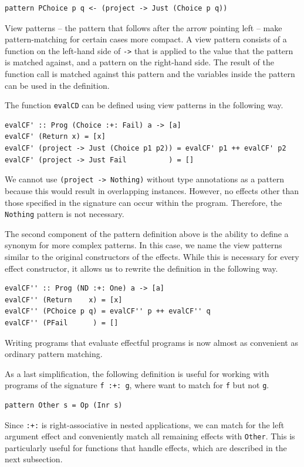 \documentclass[a4paper, 11pt, fleqn, twoside, abstract=on]{scrreprt}
\newcommand{\hinl}[1]{\texttt{#1}}
\begin{document}
\begin{verbatim}
pattern PChoice p q <- (project -> Just (Choice p q))
\end{verbatim}

View patterns -- the pattern that follows after the arrow pointing left -- make pattern-matching for certain cases more compact.
A view pattern consists of a function on the left-hand side of \hinl{->} that is applied to the value that the pattern is matched against, and a pattern on the right-hand side.
The result of the function call is matched against this pattern and the variables inside the pattern can be used in the definition.

The function \hinl{evalCD} can be defined using view patterns in the following way.

\begin{verbatim}
evalCF' :: Prog (Choice :+: Fail) a -> [a]
evalCF' (Return x) = [x]
evalCF' (project -> Just (Choice p1 p2)) = evalCF' p1 ++ evalCF' p2
evalCF' (project -> Just Fail          ) = []
\end{verbatim}
\noindent
We cannot use \hinl{(project -> Nothing)} without type annotations as a pattern because this would result in overlapping instances.
However, no effects other than those specified in the signature can occur within the program.
Therefore, the \hinl{Nothing} pattern is not necessary.

The second component of the pattern definition above is the ability to define a synonym for more complex patterns.
In this case, we name the view patterns similar to the original constructors of the effects.
While this is necessary for every effect constructor, it allows us to rewrite the definition in the following way.

\begin{verbatim}
evalCF'' :: Prog (ND :+: One) a -> [a]
evalCF'' (Return    x) = [x]
evalCF'' (PChoice p q) = evalCF'' p ++ evalCF'' q
evalCF'' (PFail      ) = []
\end{verbatim}
\noindent
Writing programs that evaluate effectful programs is now almost as convenient as ordinary pattern matching.

As a last simplification, the following definition is useful for working with programs of the signature \hinl{f :+: g}, where want to match for \hinl{f} but not \hinl{g}.

\begin{verbatim}
pattern Other s = Op (Inr s)
\end{verbatim}
\noindent
Since \hinl{:+:} is right-associative in nested applications, we can match for the left argument effect and conveniently match all remaining effects with \hinl{Other}.
This is particularly useful for functions that handle effects, which are described in the next subsection.
\end{document}
